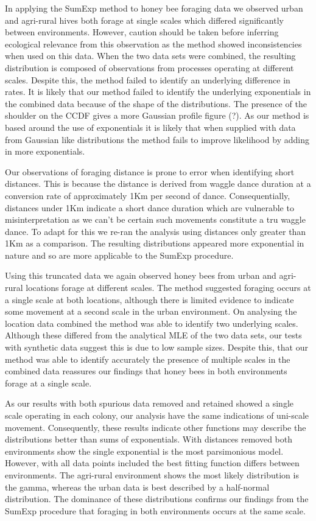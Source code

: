 \documentclass[11pt,usenames,dvipsnames]{article}
\begin{document}
In applying the SumExp method to honey bee foraging data we observed urban and agri-rural hives both forage at single scales which differed significantly between environments. However, caution should be taken before inferring ecological relevance from this observation as the method showed inconsistencies when used on this data. When the two data sets were combined, the resulting distribution is composed of observations from processes operating at different scales. Despite this, the method failed to identify an underlying difference in rates. It is likely that our method failed to identify the underlying exponentials in the combined data because of the shape of the distributions. The presence of the shoulder on the CCDF gives a more Gaussian profile figure (?). As our method is based around the use of exponentials it is likely that when supplied with data from Gaussian like distributions the method fails to improve likelihood by adding in more exponentials.

Our observations of foraging distance is prone to error when identifying short distances. This is because the distance is derived from waggle dance duration at a conversion rate of approximately 1Km per second of dance. Consequentially, distances under 1Km indicate a short dance duration which are vulnerable to misinterpretation as we can't be certain such movements constitute a tru waggle dance. To adapt for this we re-ran the analysis using distances only greater than 1Km as a comparison. The resulting distributions appeared more exponential in nature and so are more applicable to the SumExp procedure.

Using this truncated data we again observed honey bees from urban and agri-rural locations forage at different scales. The method suggested foraging occurs at a single scale at both locations, although there is limited evidence to indicate some movement at a second scale in the urban environment. On analysing the location data combined the method was able to identify two underlying scales. Although these differed from the analytical MLE of the two data sets, our tests with synthetic data suggest this is due to low sample sizes. Despite this, that our method was able to identify accurately the presence of multiple scales in the combined data reassures our findings that honey bees in both environments forage at a single scale. 

As our results with both spurious data removed and retained showed a single scale operating in each colony, our analysis have the same indications of uni-scale movement. Consequently, these results indicate other functions may describe the distributions better than sums of exponentials. With distances removed both environments show the single exponential is the most parsimonious model. However, with all data points included the best fitting function differs between environments. The agri-rural environment shows the most likely distribution is the gamma, whereas the urban data is best described by a half-normal distribution. The dominance of these distributions confirms our findings from the SumExp procedure that foraging in both environments occurs at the same scale.
\end{document}

